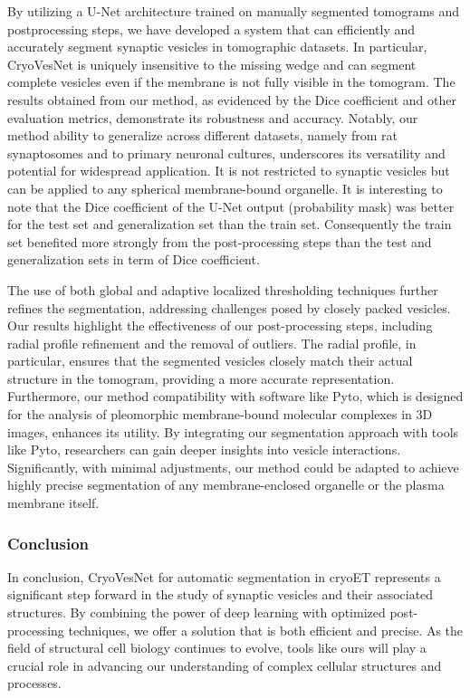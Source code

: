 By utilizing a U-Net architecture trained on manually segmented tomograms and postprocessing steps, we have developed a system that can efficiently and accurately segment synaptic vesicles in tomographic datasets.
In particular, CryoVesNet is uniquely insensitive to the missing wedge and can segment complete vesicles even if the membrane is not fully visible in the tomogram.
The results obtained from our method, as evidenced by the Dice coefficient and other evaluation metrics, demonstrate its robustness and accuracy.
Notably, our method ability to generalize across different datasets, namely from rat synaptosomes and to primary neuronal cultures, underscores its versatility and potential for widespread application.
It is not restricted to synaptic vesicles but can be applied to any spherical membrane-bound organelle.
It is interesting to note that the Dice coefficient of the U-Net output (probability mask) was better for the test set and generalization set than the train set.
Consequently the train set benefited more strongly from the post-processing steps than the test and generalization sets in term of Dice coefficient.

The use of both global and adaptive localized thresholding techniques further refines the segmentation, addressing challenges posed by closely packed vesicles.
Our results highlight the effectiveness of our post-processing steps, including radial profile refinement and the removal of outliers.
The radial profile, in particular, ensures that the segmented vesicles closely match their actual structure in the tomogram, providing a more accurate representation.
Furthermore, our method compatibility with software like Pyto, which is designed for the analysis of pleomorphic membrane-bound molecular complexes in 3D images, enhances its utility.
By integrating our segmentation approach with tools like Pyto, researchers can gain deeper insights into vesicle interactions.
Significantly, with minimal adjustments, our method could be adapted to achieve highly precise segmentation of any membrane-enclosed organelle or the plasma membrane itself.

\hypertarget{conclusion}{%
\subsubsection{Conclusion}\label{conclusion}}

In conclusion, CryoVesNet for automatic segmentation in cryoET represents a significant step forward in the study of synaptic vesicles and their associated structures.
By combining the power of deep learning with optimized post-processing techniques, we offer a solution that is both efficient and precise.
As the field of structural cell biology continues to evolve, tools like ours will play a crucial role in advancing our understanding of complex cellular structures and processes.

